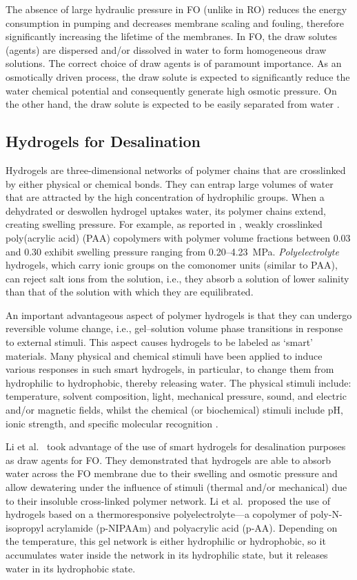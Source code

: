 \documentclass[gels,article,accept,pdftex,moreauthors]{Definitions/mdpi}
\newcommand{\ie}{{i.e.,} }
\newcommand{\etal}{{et al.}{}}
\begin{document}
The absence of large hydraulic pressure in FO (unlike in RO) reduces the energy consumption in pumping and decreases membrane scaling and fouling, therefore significantly increasing the lifetime of the membranes. 
In FO, the draw solutes (agents) are dispersed and/or dissolved in water to form homogeneous draw solutions. 
The correct choice of draw agents is of paramount importance. 
As an osmotically driven process, the draw solute is expected to significantly reduce the water chemical potential and consequently generate high osmotic pressure. 
On the other hand, the draw solute is expected to be easily separated from water \cite{Cai2016}.

\subsection{Hydrogels for Desalination}
Hydrogels are three-dimensional networks of polymer chains that are crosslinked by either physical or chemical bonds.
They can entrap large volumes of water that are attracted by the high concentration of hydrophilic groups.
When a dehydrated or deswollen hydrogel uptakes water, its polymer chains extend, creating swelling pressure.
For example, as reported in \cite{Wack_2009}, weakly crosslinked poly(acrylic acid) (PAA) copolymers with polymer volume fractions between 0.03 and 0.30 exhibit swelling pressure ranging from \mbox{0.20--4.23~MPa}.
\emph{Polyelectrolyte} hydrogels, which carry ionic groups on the comonomer units (similar to PAA),  %
can reject salt ions from the solution, \ie they absorb a solution of lower salinity than that of the solution with which they are equilibrated. %

An important advantageous aspect of polymer hydrogels is that they can undergo reversible volume change, \ie gel--solution volume phase transitions in response to external stimuli.
This aspect causes hydrogels to be labeled as ‘smart’ materials.
Many physical and chemical stimuli have been applied to induce various responses in such smart hydrogels, in particular, to change them from hydrophilic to hydrophobic, thereby releasing water.
The physical stimuli include: temperature, solvent composition, light, mechanical pressure, sound, and electric and/or magnetic fields, whilst the chemical (or biochemical) stimuli include pH, ionic strength, and specific molecular recognition \cite{Tanaka_1982,Serizawa_2001,Lietor_Santos_2009,Qiu_2001}.

Li \etal~\cite{Li2011} took advantage of the use of smart hydrogels for desalination purposes as draw agents for FO.
They demonstrated that hydrogels are able to absorb water across the FO membrane due to their swelling and osmotic pressure and
allow dewatering under the influence of stimuli (thermal and/or mechanical) due to their insoluble cross-linked polymer network.
Li \etal~proposed the use of hydrogels based on a thermoresponsive polyelectrolyte---a copolymer of poly-N-isopropyl acrylamide (p-NIPAAm) and polyacrylic acid (p-AA). Depending on the temperature, this gel network is either hydrophilic or hydrophobic, so it accumulates water inside the network in its hydrophilic state, but it releases water in its hydrophobic state.
\end{document}
